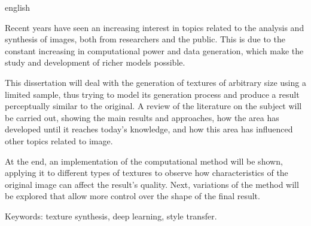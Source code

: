 \begin{resumo}[Abstract]
 \begin{otherlanguage*}{english}

Recent years have seen an increasing interest in topics related to the analysis and synthesis of images, both from researchers and the public. This is due to the constant increasing in computational power and data generation, which make the study and development of richer models possible.

This dissertation will deal with the generation of textures of arbitrary size using a limited sample, thus trying to model its generation process and produce a result perceptually similar to the original. A review of the literature on the subject will be carried out, showing the main results and approaches, how the area has developed until it reaches today's knowledge, and how this area has influenced other topics related to image.

At the end, an implementation of the computational method will be shown, applying it to different types of textures to observe how characteristics of the original image can affect the result's quality. Next, variations of the method will be explored that allow more control over the shape of the final result.

 \end{otherlanguage*}

 Keywords: texture synthesis, deep learning, style transfer.
\end{resumo}